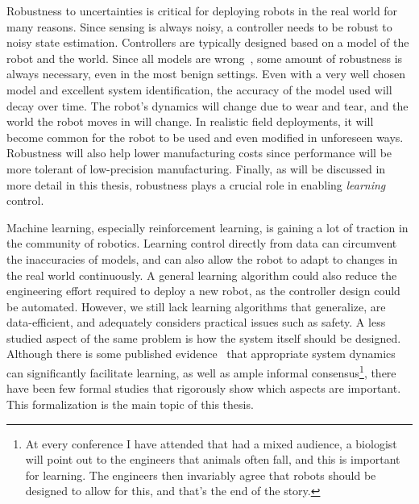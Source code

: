 Robustness to uncertainties is critical for deploying robots in the real world for many reasons.
Since sensing is always noisy, a controller needs to be robust to noisy state estimation.
Controllers are typically designed based on a model of the robot and the world. Since all models are wrong~\cite{box1976science}, some amount of robustness is always necessary, even in the most benign settings.
Even with a very well chosen model and excellent system identification, the accuracy of the model used will decay over time.
The robot's dynamics will change due to wear and tear, and the world the robot moves in will change.
In realistic field deployments, it will become common for the robot to be used and even modified in unforeseen ways.
Robustness will also help lower manufacturing costs since performance will be more tolerant of low-precision manufacturing.
Finally, as will be discussed in more detail in this thesis, robustness plays a crucial role in enabling \emph{learning} control.
\par
Machine learning, especially reinforcement learning, is gaining a lot of traction in the community of robotics. Learning control directly from data can circumvent the inaccuracies of models, and can also allow the robot to adapt to changes in the real world continuously.
A general learning algorithm could also reduce the engineering effort required to deploy a new robot, as the controller design could be automated.
However, we still lack learning algorithms that generalize, are data-efficient, and adequately considers practical issues such as safety.
A less studied aspect of the same problem is how the system itself should be designed. Although there is some published evidence~\cite{tedrake2005learning, randlov2000shaping} that appropriate system dynamics can significantly facilitate learning, as well as ample informal consensus\footnote{At every conference I have attended that had a mixed audience, a biologist will point out to the engineers that animals often fall, and this is important for learning. The engineers then invariably agree that robots should be designed to allow for this, and that's the end of the story.}, there have been few formal studies that rigorously show which aspects are important. This formalization is the main topic of this thesis.

